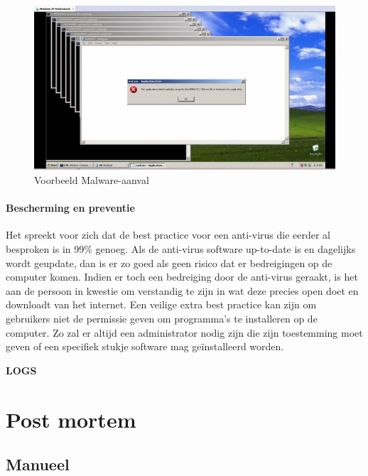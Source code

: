 \documentclass[pdftex,a4paper,12pt]{report}
\begin{document}
\begin{figure}[h!]
\begin{center}
\includegraphics[scale=0.60]{img/MalwareVoorbeeld}
\end{center}
\caption{Voorbeeld Malware-aanval}
\end{figure}

\subsubsection{Bescherming en preventie}
Het spreekt voor zich dat de best practice voor een anti-virus die eerder al besproken is in 99\% genoeg. Als de anti-virus software up-to-date is en dagelijks wordt geupdate, dan is er zo goed als geen risico dat er bedreigingen op de computer komen. Indien er toch een bedreiging door de anti-virus geraakt, is het aan de persoon in kwestie om verstandig te zijn in wat deze precies open doet en downloadt van het internet. Een veilige extra best practice kan zijn om gebruikers niet de permissie geven om programma's te installeren op de computer. Zo zal er altijd een administrator nodig zijn die zijn toestemming moet geven of een specifiek stukje software mag geïnstalleerd worden.

\textbf{LOGS}

\chapter{Post mortem}
\section{Manueel}
\end{document}
